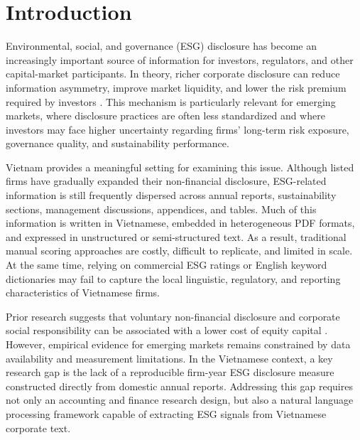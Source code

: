 \documentclass{article}
\theoremstyle{plain}
\theoremstyle{definition}
\theoremstyle{remark}
\begin{document}
\section{Introduction}
\label{sec:introduction}

Environmental, social, and governance (ESG) disclosure has become an increasingly important source of information for investors, regulators, and other capital-market participants. In theory, richer corporate disclosure can reduce information asymmetry, improve market liquidity, and lower the risk premium required by investors \citep{diamond1991disclosure,easley2004information}. This mechanism is particularly relevant for emerging markets, where disclosure practices are often less standardized and where investors may face higher uncertainty regarding firms' long-term risk exposure, governance quality, and sustainability performance.

Vietnam provides a meaningful setting for examining this issue. Although listed firms have gradually expanded their non-financial disclosure, ESG-related information is still frequently dispersed across annual reports, sustainability sections, management discussions, appendices, and tables. Much of this information is written in Vietnamese, embedded in heterogeneous PDF formats, and expressed in unstructured or semi-structured text. As a result, traditional manual scoring approaches are costly, difficult to replicate, and limited in scale. At the same time, relying on commercial ESG ratings or English keyword dictionaries may fail to capture the local linguistic, regulatory, and reporting characteristics of Vietnamese firms.


Prior research suggests that voluntary non-financial disclosure and corporate social responsibility can be associated with a lower cost of equity capital \citep{dhaliwal2011voluntary,elghoul2011csr,chava2014environmental}. However, empirical evidence for emerging markets remains constrained by data availability and measurement limitations. In the Vietnamese context, a key research gap is the lack of a reproducible firm-year ESG disclosure measure constructed directly from domestic annual reports. Addressing this gap requires not only an accounting and finance research design, but also a natural language processing framework capable of extracting ESG signals from Vietnamese corporate text.
\end{document}
